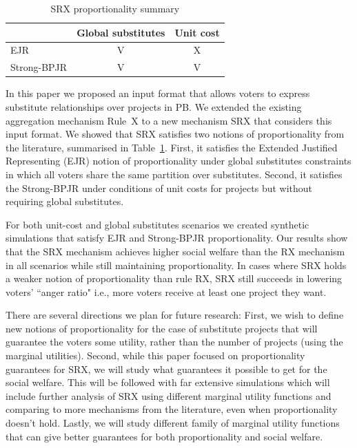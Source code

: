 \documentclass[runningheads]{llncs}
\begin{document}
\vspace{-7mm}
\begin{table}[ht!]
  \begin{center}
    \begin{tabular}{l|c|c|}
      & Global substitutes & Unit cost\\
      \hline
      EJR & V & X\\
      Strong-BPJR & V & V\\
    \end{tabular}
    \caption{\label{tab:prop}SRX proportionality summary}
  \end{center}
\end{table}
\vspace{-7mm}

In this paper we proposed an input format that allows  voters to express substitute relationships over projects in PB.  
We extended the existing aggregation mechanism  Rule~X  to a new mechanism  SRX  that considers this input format. 
We showed that   SRX satisfies two notions of proportionality from the literature, summarised in Table~\ref{tab:prop}. First, it satisfies   the Extended Justified Representing (EJR) notion of proportionality \cite{peters2020proportional} under global substitutes constraints in which all voters share the same partition over substitutes. Second,  it satisfies the  Strong-BPJR \cite{aziz2017proportionally} under conditions of    unit costs for projects but without requiring global substitutes. 

For both unit-cost and global substitutes scenarios  we created synthetic simulations that  satisfy   EJR and Strong-BPJR   proportionality. Our results show that the  SRX mechanism    achieves higher social welfare  than the RX mechanism in all scenarios while still maintaining  proportionality. In cases where SRX holds a weaker notion of proportionality than rule RX, SRX  still succeeds in lowering voters' ``anger ratio" i.e.,   more voters receive at least one project they want.

There are several directions we plan for future research:
First, we wish to define new notions of  proportionality for the case of substitute projects that will guarantee the voters some utility, rather than the  number of projects (using the marginal utilities).
Second, while this paper focused on proportionality guarantees for SRX, we will study what guarantees it possible to get for the social welfare.
This will be followed with far extensive simulations which will include further analysis of SRX using different marginal utility functions and comparing to more mechanisms from the literature, even when proportionality doesn't hold.
Lastly, we will study different family of marginal utility functions that can give better guarantees for both proportionality and social welfare.
\end{document}
